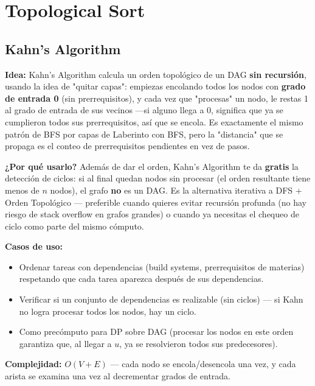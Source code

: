 \documentclass[10pt,a4paper,twocolumn]{article}
\begin{document}
\section{Topological Sort}
\subsection{Kahn's Algorithm}

\textbf{Idea:} Kahn's Algorithm calcula un orden topológico de un DAG
\textbf{sin recursión}, usando la idea de "quitar capas": empiezas
encolando todos los nodos con \textbf{grado de entrada 0} (sin
prerrequisitos), y cada vez que "procesas" un nodo, le restas 1 al
grado de entrada de sus vecinos —si alguno llega a 0, significa que
ya se cumplieron todos sus prerrequisitos, así que se encola. Es
exactamente el mismo patrón de BFS por capas de Laberinto con BFS,
pero la "distancia" que se propaga es el conteo de prerrequisitos
pendientes en vez de pasos.

\textbf{¿Por qué usarlo?} Además de dar el orden, Kahn's Algorithm te
da \textbf{gratis} la detección de ciclos: si al final quedan nodos
sin procesar (el orden resultante tiene menos de $n$ nodos), el grafo
\textbf{no} es un DAG. Es la alternativa iterativa a DFS + Orden
Topológico — preferible cuando quieres evitar recursión profunda (no
hay riesgo de stack overflow en grafos grandes) o cuando ya necesitas
el chequeo de ciclo como parte del mismo cómputo.

\textbf{Casos de uso:}

\begin{itemize}
	\item Ordenar tareas con dependencias (build systems, prerrequisitos
	de materias) respetando que cada tarea aparezca después de sus
	dependencias.
	\item Verificar si un conjunto de dependencias es realizable (sin
	ciclos) — si Kahn no logra procesar todos los nodos, hay un ciclo.
	\item Como precómputo para DP sobre DAG (procesar los nodos en
	este orden garantiza que, al llegar a $u$, ya se resolvieron
	todos sus predecesores).
\end{itemize}

\textbf{Complejidad:} $O(V + E)$ — cada nodo se encola/desencola una
vez, y cada arista se examina una vez al decrementar grados de
entrada.
\end{document}

